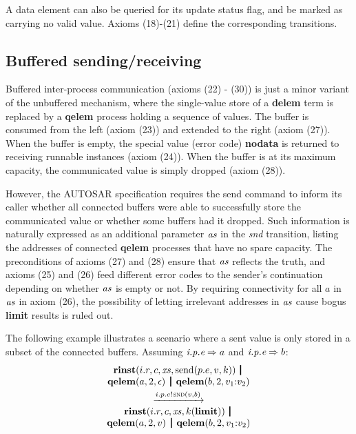 \documentclass[twocolumn]{article}
\begin{document}
A data element can also be queried for its update status flag, and be marked as carrying no valid value. Axioms (18)-(21) define the corresponding transitions.

\subsection{Buffered sending/receiving} \label{sect:BufSndRcv}

Buffered inter-process communication (axioms (22) - (30)) is just a minor variant of the unbuffered mechanism, where the single-value store of a \textbf{delem} term is replaced by a \textbf{qelem} process holding a sequence of values. The buffer is consumed from the left (axiom (23)) and extended to the right (axiom (27)). When the buffer is empty, the special value (error code) \textbf{nodata} is returned to receiving runnable instances (axiom (24)). When the buffer is at its maximum capacity, the communicated value is simply dropped (axiom (28)).

However, the AUTOSAR specification requires the send command to inform its caller whether all connected buffers were able to successfully store the communicated value or whether some buffers had it dropped. Such information is naturally expressed as an additional parameter $\Tvar{as}$ in the \emph{snd} transition, listing the addresses of connected \textbf{qelem} processes that have no spare capacity. The preconditions of axioms (27) and (28) ensure that $\Tvar{as}$ reflects the truth, and axioms (25) and (26) feed different error codes to the sender's continuation depending on whether $\Tvar{as}$ is empty or not. By requiring connectivity for all $a$ in $\Tvar{as}$ in axiom (26), the possibility of letting irrelevant addresses in $\Tvar{as}$ cause bogus \textbf{limit} results is ruled out.


The following example illustrates a scenario where a sent value is only stored in a subset of the connected buffers. Assuming $\Tconnect {\Tep e p i} a$ and $\Tconnect {\Tep e p i} b$:
$$
\begin{array}{c}
  \Trinst {i.r} c \Xs {\TrteSend {p.e} v k} \,\Opar  \\
  {\Tqelem a 2 \Teps} \Opar {\Tqelem b 2 {\Tcons {v_1} {v_2}}} \vspace{0.6ex} \\
  \red{\say{i.p.e}{\Tsnd v b}} \\
  \Trinst {i.r} c \Xs {\Tap k \Tlimit} \,\Opar \\
  {\Tqelem a 2 v} \Opar {\Tqelem b 2 {\Tcons {v_1} {v_2}}}
\end{array}
$$
\end{document}
